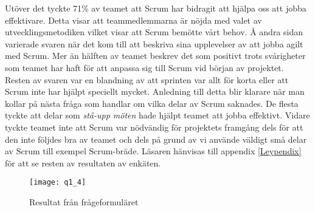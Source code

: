 Utöver det tyckte 71\% av teamet att Scrum har bidragit att hjälpa oss att jobba effektivare. Detta visar att teammedlemmarna är nöjda med valet av utvecklingsmetodiken vilket visar att Scrum bemötte vårt behov. Å andra sidan varierade svaren när det kom till att beskriva sina upplevelser av att jobba agilt med Scrum. Mer än hälften av teamet beskrev det som positivt trots svårigheter som teamet har haft för att anpassa sig till Scrum vid början av projektet. Resten av svaren var en blandning av att sprinten var allt för korta eller att Scrum inte har hjälpt speciellt mycket. Anledning till detta blir klarare när man kollar på nästa fråga som handlar om vilka delar av Scrum saknades. De flesta tyckte att delar som \textit{stå-upp möten} hade  hjälpt teamet att jobba effektivt. Vidare tyckte teamet inte att Scrum var nödvändig för projektets framgång dels för att den inte följdes bra av teamet och dels på grund av vi använde väldigt små delar av Scrum till exempel Scrum-bräde.
Läsaren hänvisas till appendix \ref{Leypendix} för att se resten av resultaten av enkäten.
\begin{figure*}[h]
	\centering
	\texttt{[image: q1\_4]}
	\caption{Resultat från frågeformuläret}\label{fig1}
	\label{q1}
\end{figure*}
